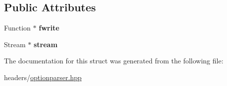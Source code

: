 \subsection*{Public Attributes}
\begin{DoxyCompactItemize}
\item 
\mbox{\label{structoption_1_1PrintUsageImplementation_1_1StreamWriter_a6f54abc9a3f7f00206d87a3619713954}} 
Function $\ast$ {\bfseries fwrite}
\item 
\mbox{\label{structoption_1_1PrintUsageImplementation_1_1StreamWriter_ab4bfd31b1c37376505ccd4230f7f7ad9}} 
Stream $\ast$ {\bfseries stream}
\end{DoxyCompactItemize}


The documentation for this struct was generated from the following file\+:\begin{DoxyCompactItemize}
\item 
headers/\hyperlink{optionparser_8hpp}{optionparser.\+hpp}\end{DoxyCompactItemize}
